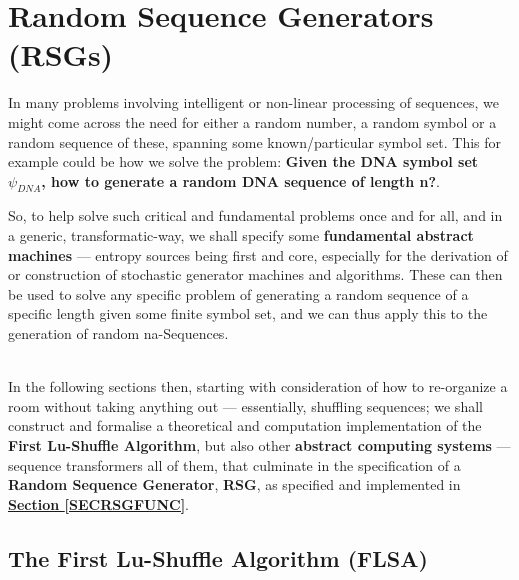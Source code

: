 \documentclass[a4paper, 18pt]{book} %
\begin{document}
\chapter{Random Sequence Generators (RSGs)}
\label{SECRSG}


In many problems involving intelligent or non-linear processing of sequences, we might come across the need for either a random number, a random symbol or a random sequence of these, spanning some known/particular symbol set. This for example could be how we solve the problem: \textbf{Given the DNA symbol set $\psi_{DNA}$, how to generate a random DNA sequence of length n?}.

So, to help solve such critical and fundamental problems once and for all, and in a generic, transformatic-way, we shall specify some \textbf{fundamental abstract machines} --- entropy sources being first and core, especially for the derivation of or construction of stochastic generator machines and algorithms. These can then be used to solve any specific problem of generating a random sequence of a specific length given some finite symbol set, and we can thus apply this to the generation of random na-Sequences.




\\


In the following sections then, starting with consideration of how to re-organize a room without taking anything out --- essentially, shuffling sequences; we shall construct and formalise a theoretical and computation implementation of  the \textbf{First Lu-Shuffle Algorithm}, but also other \textbf{abstract computing systems} --- sequence transformers all of them, that culminate in the specification of a \textbf{Random Sequence Generator}, \textbf{RSG}, as specified and implemented in \textbf{\hyperref[SECRSGFUNC]{Section \ref{SECRSGFUNC}}}.

\section{The First Lu-Shuffle Algorithm (FLSA)}
\end{document}
